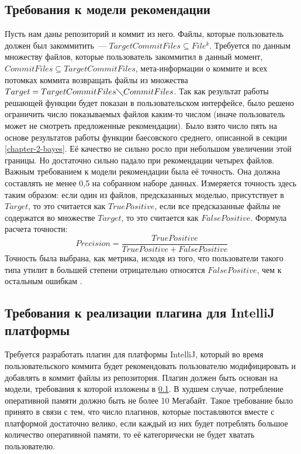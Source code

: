 \subsection{Требования к модели рекомендации}\label{ml-model-req}
Пусть нам даны репозиторий и коммит из него. Файлы, которые пользователь должен был закоммитить~--- $TargetCommitFiles \subseteq File^k$. Требуется по данным множеству файлов, которые пользователь закоммитил в данный момент, $CommitFiles \subseteq TargetCommitFiles$, мета-информации о коммите и всех потомках коммита возвращать файлы из множества $Target = TargetCommitFiles \diagdown CommitFiles$. Так как результат работы решающей функции будет показан в пользовательском интерфейсе, было решено ограничить число показываемых файлов каким-то числом (иначе пользователь может не смотреть предложенные рекомендации). Было взято число пять на основе результатов работы функции баесовского среднего, описанной в секции \ref{chapter-2-bayes}. Её качество не сильно росло при небольшом увеличении этой границы. Но достаточно сильно падало при рекомендации четырех файлов. Важным требованием к модели рекомендации была её точность. Она должна составлять не менее 0,5 на собранном наборе данных. Измеряется точность здесь таким образом: если один из файлов, предсказанных моделью, присутствует в $Target$, то это считается как $True Positive$, если все предсказанные файлы не содержатся во множестве $Target$, то это считается как $False Positive$. Формула расчета точности:
    $$Precision = \frac{True Positive}{True Positive + False Positive}$$
Точность была выбрана, как метрика, исходя из того, что пользователи такого типа утилит в большей степени отрицательно относятся $False Positive$, чем к остальным ошибкам \cite{microsoft-false-positive}.
\subsection{Требования к реализации плагина для IntelliJ платформы}\label{impl-req}
Требуется разработать плагин для платформы IntelliJ, который во время пользовательского коммита будет рекомендовать пользователю модифицировать и добавлять в коммит файлы из репозитория. Плагин должен быть основан на модели, требования к которой изложены в \ref{ml-model-req}. В худшем случае, потребление оперативной памяти должно быть не более 10 Мегабайт. Такое требование было принято в связи с тем, что число плагинов, которые поставляются вместе с платформой достаточно велико, если каждый из них будет потреблять большое количество оперативной памяти, то её категорически не будет хватать пользователю.

